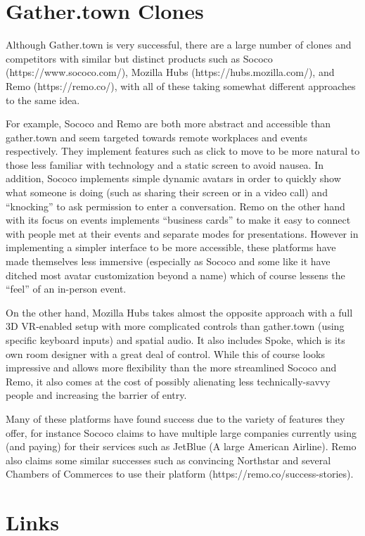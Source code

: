 \documentclass[bsc,frontabs,singlespacing,parskip,deptreport]{infthesis}
\begin{document}
\section{Gather.town Clones}

Although Gather.town is very successful, there are a large number of clones and competitors with similar but distinct products such as Sococo (https://www.sococo.com/), Mozilla Hubs (https://hubs.mozilla.com/), and Remo (https://remo.co/), with all of these taking somewhat different approaches to the same idea.

For example, Sococo and Remo are both more abstract and accessible than gather.town and seem targeted towards remote workplaces and events respectively.  They implement features such as click to move to be more natural to those less familiar with technology and a static screen to avoid nausea.  In addition, Sococo implements simple dynamic avatars in order to quickly show what someone is doing (such as sharing their screen or in a video call) and “knocking” to ask permission to enter a conversation.  Remo on the other hand with its focus on events implements “business cards” to make it easy to connect with people met at their events and separate modes for presentations.  However in implementing a simpler interface to be more accessible, these platforms have made themselves less immersive (especially as Sococo and some like it have ditched most avatar customization beyond a name) which of course lessens the “feel” of an in-person event.

On the other hand, Mozilla Hubs takes almost the opposite approach with a full 3D VR-enabled setup with more complicated controls than gather.town (using specific keyboard inputs) and spatial audio.  It also includes Spoke, which is its own room designer with a great deal of control.  While this of course looks impressive and allows more flexibility than the more streamlined Sococo and Remo, it also comes at the cost of possibly alienating less technically-savvy people and increasing the barrier of entry.

Many of these platforms have found success due to the variety of features they offer, for instance Sococo claims to have multiple large companies currently using (and paying) for their services such as JetBlue (A large American Airline). Remo also claims some similar successes such as convincing Northstar and several Chambers of Commerces to use their platform (https://remo.co/success-stories).

\section{Links}
\end{document}

